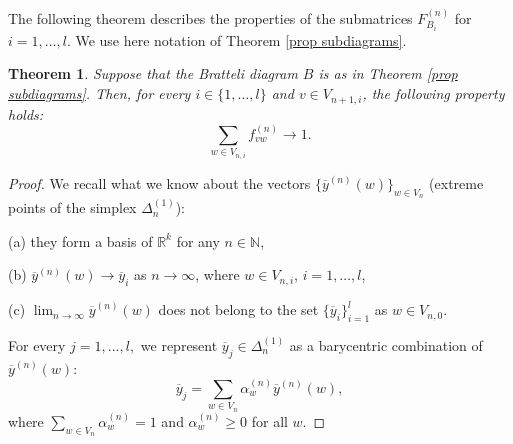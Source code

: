 \documentclass[11pt, english, reqno]{amsart}
\theoremstyle{definition}
\theoremstyle{remark}
\theoremstyle{plain}
\newtheorem{thm}[defin]{Theorem}
\def\ov{\overline}
\numberwithin{equation}{section}
\begin{document}
{The following theorem describes the properties of the submatrices
 $F^{(n)}_{B_i}$ for $i = 1,\ldots,l$.
We use here notation of Theorem \ref{prop subdiagrams}.

\begin{thm}\label{estimate1}
Suppose that the Bratteli diagram $B$ is as in Theorem
\ref{prop subdiagrams}. Then, for every $i \in \{1, \ldots, l\}$ and $v \in V_{n+1,i}$, the
 following property holds:
$$
\sum_{w \in V_{n,i}} f^{(n)}_{vw} \rightarrow 1.
$$
\end{thm}

\begin{proof}
We recall what we know about the vectors
$\{\ov y^{(n)}(w)\}_{w \in V_n}$ (extreme points of the
simplex $\Delta^{(1)}_n$):

(a) they form a basis of $\mathbb{R}^k$ for any
 $n \in \mathbb{N}$,

 (b) $\ov y^{(n)}(w) \rightarrow \ov y_i$ as $n \rightarrow \infty$,
 where $w \in V_{n,i}$, $i = 1, \ldots,l$,

  (c)   $\lim_{n   \rightarrow \infty} \ov y^{(n)}(w)$ does not belong to the
  set  $\{\ov y_i\}_{i = 1}^l$ as $w \in V_{n,0}$.

For every $j = 1, ..., l,$ we represent $\ov y_j \in   \Delta_n^{(1)}$ as a
 barycentric combination of $\ov y^{(n)}(w)$:
\begin{equation}\label{eq baryc comb}
\ov y_j = \sum_{w \in V_n}\alpha_w^{(n)} \ov y^{(n)}(w),
\end{equation}
where $\sum_{w \in V_n} \alpha_w^{(n)} = 1$ and $\alpha_w^{(n)} \geq 0$ for all
$w$.


\end{proof}}
\end{document}
